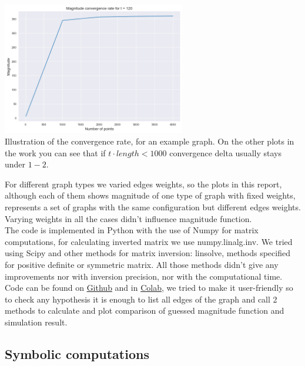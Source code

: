 \documentclass{article}
\begin{document}
\begin{center}
\includegraphics[width=0.6\textwidth]{convergence} \\ Illustration of the convergence
    rate, for an example graph. On the other plots in the work you can see that if 
    $t \cdot length < 1000$ convergence delta usually stays under $1-2$.
\end{center}



For different graph types we varied edges weights, so the plots in this report,
although each of them shows magnitude of one type of graph with fixed weights,
represents a set of graphs with the same configuration but different edges weights.
Varying weights in all the cases didn't influence magnitude function. 
\\ 

The code is implemented in Python with the use of Numpy for matrix computations,
for calculating inverted matrix we use numpy.linalg.inv. 
We tried using Scipy and other methods for matrix inversion: linsolve, methods
specified for positive definite or symmetric matrix. All those methods didn't give
any improvements nor with inversion precision, nor with the computational time. 
\\

Code can be found on \href{https://github.com/mmanchkin/magnitude}{Github} and in
\href{https://colab.research.google.com/drive/17Wlg996wKO1tZD9EBfn9G5qiL2nD_5LM?usp=sharing}{Colab},
we tried to make it user-friendly 
so to check any hypothesis it is enough to list all edges of the graph and call 2 methods
to calculate and plot comparison of guessed magnitude function and simulation result. 
\\

\subsection{Symbolic computations}
\end{document}
